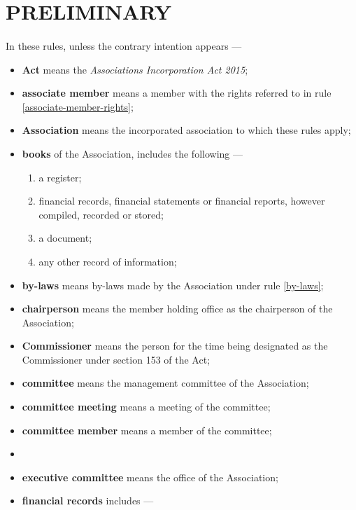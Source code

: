 \documentclass[../constitution.tex]{subfiles}
\begin{document}
\part{PRELIMINARY} \label{part-1---preliminary}

\subsection{} \label{terms-used}

In these rules, unless the contrary intention appears ---

\begin{itemize}[label={-}]
\item \textbf{Act} means the \textit{Associations Incorporation Act 2015};
\item \textbf{associate member} means a member with the rights referred to in rule \ref{associate-member-rights};
\item \textbf{Association} means the incorporated association to which these rules apply;
\item \textbf{books} of the Association, includes the following ---

  \begin{enumerate}
  \def\labelenumi{\alph{enumi})}
  \setcounter{enumi}{0}
  
  \item a register;
  \item financial records, financial statements or financial reports, however compiled, recorded or stored;
  \item a document;
  \item any other record of information;
  \end{enumerate}
\item \textbf{by-laws} means by-laws made by the Association under rule \ref{by-laws};
\item \textbf{chairperson} means the  member holding office as the chairperson of the Association;
\item \textbf{Commissioner} means the person for the time being designated as the Commissioner under section 153 of the Act;
\item \textbf{committee} means the management committee of the Association;
\item \textbf{committee meeting} means a meeting of the committee;
\item \textbf{committee member} means a member of the committee;
\item {}
\item \textbf{executive committee} means the office  of the Association; 
\item \textbf{financial records} includes ---


\end{itemize}
\end{document}
